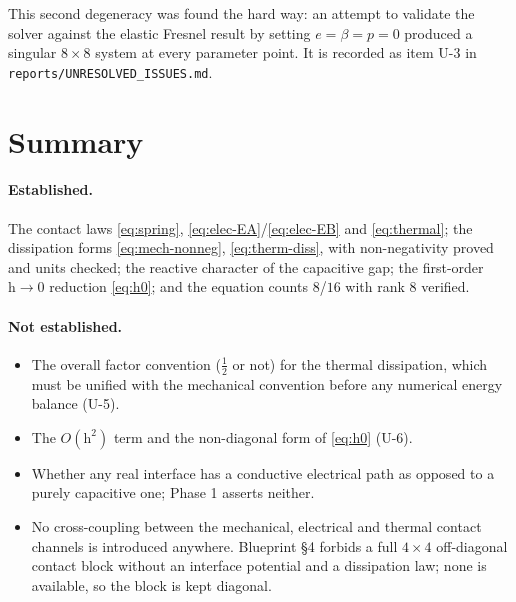 \documentclass[11pt]{article}
\theoremstyle{plain}
\begin{document}
This second degeneracy was found the hard way: an attempt to validate the solver
against the elastic Fresnel result by setting $e=\beta=p=0$ produced a singular
$8\times8$ system at every parameter point. It is recorded as item U-3 in
\texttt{reports/UNRESOLVED\_ISSUES.md}.

\section{Summary}
\label{sec:summary}

\paragraph{Established.}
The contact laws \eqref{eq:spring}, \eqref{eq:elec-EA}/\eqref{eq:elec-EB} and
\eqref{eq:thermal}; the dissipation forms \eqref{eq:mech-nonneg},
\eqref{eq:therm-diss}, with non-negativity proved and units checked; the
reactive character of the capacitive gap; the first-order $\mathrm{h}\to0$
reduction \eqref{eq:h0}; and the equation counts $8$/$16$ with rank $8$ verified.

\paragraph{Not established.}
\begin{itemize}
  \item The overall factor convention ($\tfrac12$ or not) for the thermal
        dissipation, which must be unified with the mechanical convention before
        any numerical energy balance (U-5).
  \item The $O(\mathrm{h}^2)$ term and the non-diagonal form of \eqref{eq:h0}
        (U-6).
  \item Whether any real interface has a conductive electrical path as opposed to
        a purely capacitive one; Phase 1 asserts neither.
  \item No cross-coupling between the mechanical, electrical and thermal contact
        channels is introduced anywhere. Blueprint \S4 forbids a full $4\times4$
        off-diagonal contact block without an interface potential and a
        dissipation law; none is available, so the block is kept diagonal.
\end{itemize}
\end{document}

